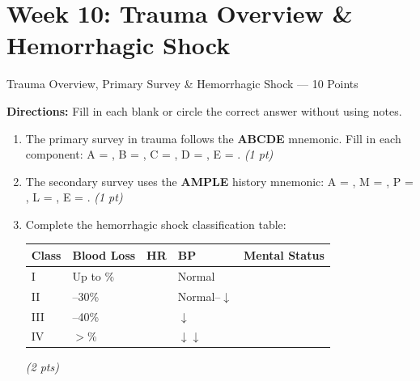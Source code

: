 \documentclass[11pt,letterpaper]{article}
\newcommand{\blank}[1][3cm]{\underline{\hspace{#1}}}
\begin{document}
\newpage


\section{Week 10: Trauma Overview \& Hemorrhagic Shock}

\begin{diagbox}{Trauma Overview, Primary Survey \& Hemorrhagic Shock --- 10 Points}

\textbf{Directions:} Fill in each blank or circle the correct answer without using notes.

\begin{enumerate}[leftmargin=1.5em, label=\textbf{\arabic*.},start=91]

  \item The primary survey in trauma follows the \textbf{ABCDE} mnemonic.  Fill in each component:
        A = \blank[3cm], B = \blank[3cm], C = \blank[3cm],
        D = \blank[3cm], E = \blank[3cm].
        \hfill\textit{(1 pt)}

  \item The secondary survey uses the \textbf{AMPLE} history mnemonic:
        A = \blank[3cm], M = \blank[3cm], P = \blank[3cm],
        L = \blank[3cm], E = \blank[3cm].
        \hfill\textit{(1 pt)}

  \item Complete the hemorrhagic shock classification table:

  \vspace{0.3cm}
  \begin{center}
  \renewcommand{\arraystretch}{1.7}
  \begin{tabular}{|p{1.5cm}|p{2cm}|p{2cm}|p{2cm}|p{3cm}|}
  \hline
  \textbf{Class} & \textbf{Blood Loss} & \textbf{HR} & \textbf{BP} & \textbf{Mental Status} \\
  \hline
  I   & Up to \blank[1.2cm]\% & \blank[1.2cm] & Normal & \blank[2.5cm] \\
  \hline
  II  & \blank[1.2cm]--30\%   & \blank[1.2cm] & Normal--$\downarrow$ & \blank[2.5cm] \\
  \hline
  III & \blank[1.2cm]--40\%   & \blank[1.2cm] & $\downarrow$ & \blank[2.5cm] \\
  \hline
  IV  & $>$\blank[1.2cm]\%   & \blank[1.2cm] & $\downarrow\downarrow$ & \blank[2.5cm] \\
  \hline
  \end{tabular}
  \end{center}
  \hfill\textit{(2 pts)}


\end{enumerate}
\end{diagbox}
\end{document}
